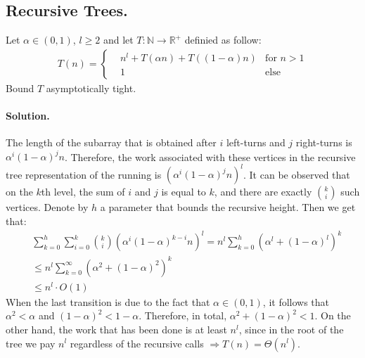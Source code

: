 \fi 


\subsection{Recursive Trees.}
Let $\alpha \in (0,1)$, $l\ge 2$ and let $T: \mathbb{N}\rightarrow\mathbb{R}^{+}$ definied as follow:
\begin{equation*}
  \begin{split}
    T\left(n\right)  = \left\{ \begin{array}{rcl}
        & n^{l} + T\left( \alpha n \right) + T\left( (1-\alpha) n \right)  & \mbox{for }  n > 1  \\
      & 1 & \mbox{else}  
  \end{array} \right. 
  \end{split}
\end{equation*}
Bound $T$ asymptotically tight. 
\ifdefined\SOLUTION
  \paragraph{Solution.}  The length of the subarray that is obtained after $i$ left-turns and $j$ right-turns is $\alpha^{i}(1-\alpha)^{j}n$. Therefore, the work associated with these vertices in the recursive tree representation of the running is $(\alpha^{i}(1-\alpha)^{j}n)^{l}$. It can be observed that on the $k$th level, the sum of $i$ and $j$ is equal to $k$, and there are exactly ${k \choose i}$ such vertices. Denote by $h$ a parameter that bounds the recursive height. Then we get that:
  \begin{equation*}
    \begin{split}
      & \sum_{k=0}^{h}{\sum_{i=0}^{k}{ { k \choose i  } \left( \alpha^{i}(1-\alpha)^{k-i} n \right)^{l}} } =  n^{l}\sum_{k=0}^{h}{ \left( \alpha^{l} + (1-\alpha)^{l} \right)^{k} } \\ 
        & \le n^{l}\sum_{k=0}^{\infty}{ \left( \alpha^{2} + (1-\alpha)^{2} \right)^{k} } \\ 
        & \le n^{l} \cdot O(1)
    \end{split}
  \end{equation*}
When the last transition is due to the fact that $\alpha \in (0,1)$, it follows that $\alpha^{2} < \alpha$ and $(1-\alpha)^{2} < 1 - \alpha$. Therefore, in total, $\alpha^{2} + (1-\alpha)^{2} < 1$. On the other hand, the work that has been done is at least $n^{l}$, since in the root of the tree we pay $n^{l}$ regardless of the recursive calls $\Rightarrow T(n) = \Theta(n^{l})$. 

